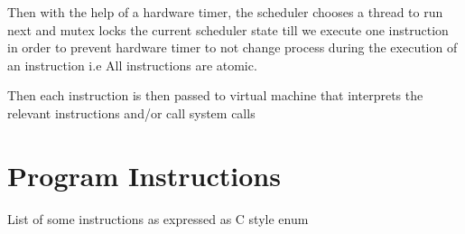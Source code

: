 \documentclass[12pt]{report}
\begin{document}
    Then with the help of a hardware timer, the scheduler chooses a thread to run next and 
    mutex locks the current scheduler state till we execute one instruction in order to 
    prevent hardware timer to not change process during the execution of an instruction 
    i.e All instructions are atomic.

    Then each instruction is then passed to virtual machine that interprets the relevant 
    instructions and/or call system calls


    
    \pagebreak
    
    \section{Program Instructions}
    List of some instructions as expressed as C style enum
\end{document}
